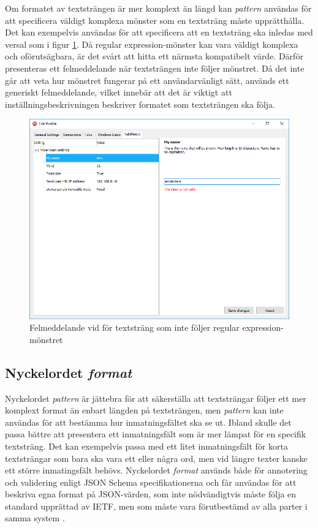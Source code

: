 Om formatet av textsträngen är mer komplext än längd kan \textit{pattern} användas för att specificera väldigt komplexa mönster som en textsträng måste upprätthålla. Det kan exempelvis användas för att specificera att en textsträng ska inledas med versal som i figur \ref{fig:textstrang-pattern}. Då regular expression-mönster kan vara väldigt komplexa och oförutsägbara, är det svårt att hitta ett närmsta kompatibelt värde. Därför presenteras ett felmeddelande när textsträngen inte följer mönstret. Då det inte går att veta hur mönstret fungerar på ett användarvänligt sätt, används ett generiskt felmeddelande, vilket innebär att det är viktigt att inställningsbeskrivningen beskriver formatet som textsträngen ska följa.

\begin{figure}
	\includegraphics[width=\textwidth]{./images/gui/textstrang-pattern.png}
	\vspace{-1.7em}
	\caption{Felmeddelande vid för textsträng som inte följer regular expression-mönstret}
	\label{fig:textstrang-pattern}
\end{figure}

\FloatBarrier
\subsection{Nyckelordet \textit{format}}

Nyckelordet \textit{pattern} är jättebra för att säkerställa att textsträngar följer ett mer komplext format än enbart längden på textsträngen, men \textit{pattern} kan inte användas för att bestämma hur inmatningsfältet ska se ut. Ibland skulle det passa bättre att presentera ett inmatningsfält som är mer lämpat för en specifik textsträng. Det kan exempelvis passa med ett litet inmatningsfält för korta textsträngar som bara ska vara ett eller några ord, men vid längre texter kanske ett större inmatingsfält behövs. Nyckelordet \textit{format} används både för annotering och validering enligt JSON Schema specifikationerna och får användas för att beskriva egna format på JSON-värden, som inte nödvändigtvis måste följa en standard upprättad av IETF, men som måste vara förutbestämd av alla parter i samma system \cite{Andrews2018}.

